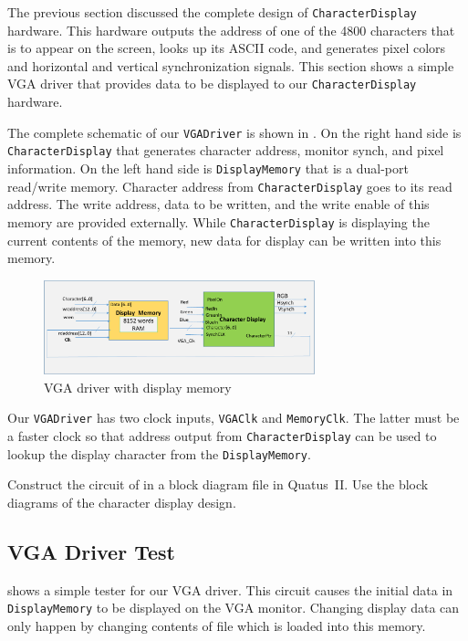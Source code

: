 \documentclass[12pt, logo=tehranDLDL/ut]{tehranDLDL}
\begin{document}
The previous section discussed the complete design of \lstinline{CharacterDisplay} hardware. This hardware outputs the address of one of the 4800 characters that is to appear on the screen, looks up its ASCII code, and generates pixel colors and horizontal and vertical synchronization signals.
This section shows a simple VGA driver that provides data to be displayed to our \lstinline{CharacterDisplay} hardware.

The complete schematic of our \lstinline{VGADriver} is shown in . On the right hand side is \lstinline{CharacterDisplay} that generates character address, monitor synch, and pixel information. On the left hand side is \lstinline{DisplayMemory} that is a dual-port read/write memory. Character address from \lstinline{CharacterDisplay} goes to its read address. The write address, data to be written, and the write enable of this memory are provided externally. While \lstinline{CharacterDisplay} is displaying the current contents of the memory, new data for display can be written into this memory.

\begin{figure}
    \centering
    \caption{VGA driver with display memory\label{fig:driver}}
    \includegraphics[width=0.7\textwidth]{driver}
\end{figure}

Our \lstinline{VGADriver} has two clock inputs, \lstinline{VGAClk} and \lstinline{MemoryClk}. The latter must be a faster clock so that address output from \lstinline{CharacterDisplay} can be used to lookup the display character from the \lstinline{DisplayMemory}.

Construct the circuit of  in a block diagram file in Quatus~II. Use the block diagrams of the character display design.

\designverification{}

\subsection{VGA Driver Test}

 shows a simple tester for our VGA driver. This circuit causes the initial data in \lstinline{DisplayMemory} to be displayed on the VGA monitor. Changing display data can only happen by changing contents of  file which is loaded into this memory.
\end{document}
